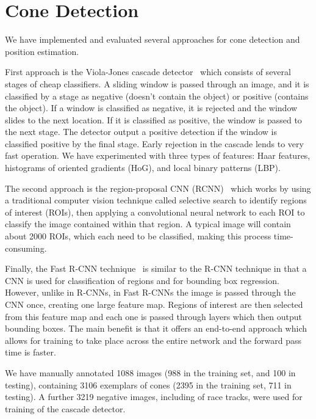 \documentclass[a4paper, 10pt, conference]{ieeeconf}      %
\begin{document}
\section{Cone Detection}
We have implemented and evaluated several approaches for cone detection and
position estimation.

First approach is the Viola-Jones cascade detector~\cite{viola01} which
consists of several stages of cheap classifiers. A sliding
window is passed through an image, and it is classified by a stage as negative
(doesn't contain the object) or positive (contains the object). If a window is
classified as negative, it is rejected and the window slides to the next
location. If it is classified as positive, the window is passed to the next
stage. The detector output a positive detection if the window is classified
positive by the final stage. Early rejection in the cascade lends to very fast
operation. We have experimented with three types of features: Haar features,
histograms of oriented gradients (HoG), and local binary patterns (LBP).

The second approach is the region-proposal CNN (RCNN)~\cite{girshick13} which
works by using a traditional computer vision technique called selective search
to identify regions of interest (ROIs), then applying a convolutional neural
network to each ROI to classify the image contained within that region. A
typical image will contain about 2000 ROIs, which each need to be classified,
making this process time-consuming.

Finally, the Fast R-CNN technique~\cite{girshick15} is similar to the R-CNN technique in that a CNN is used for classification of regions and for bounding box regression. However, unlike in R-CNNs, in Fast R-CNNs the image is passed through the CNN once, creating one large feature map. Regions of interest are then selected from this feature map and each one is passed through layers which then output bounding boxes. The main benefit is that it offers an end-to-end approach which allows for training to take place across the entire network and the forward pass time is faster. 

We have manually annotated 1088 images (988 in the training set, and 100 in
testing), containing 3106 exemplars of cones (2395 in the training set, 711 in testing).
A further 3219 negative images, including of race tracks, were used for
training of the cascade detector.

\end{document}
